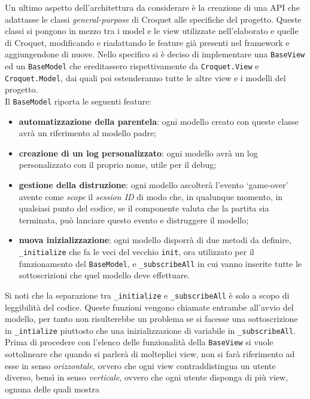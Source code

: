 \newline
Un ultimo aspetto dell'architettura da considerare è la creazione di una API che adattasse le classi \textit{general-purpose} di Croquet alle specifiche del progetto. Queste classi si pongono
in mezzo tra i model e le view utilizzate nell'elaborato e quelle di Croquet, modificando e riadattando le feature già presenti nel framework e aggiungendone di nuove. Nello specifico
si è deciso di implementare una \texttt{BaseView} ed un \texttt{BaseModel} che ereditassero rispettivamente da \texttt{Croquet.View} e \texttt{Croquet.Model}, dai quali poi estenderanno
tutte le altre view e i modelli del progetto.\\
Il \texttt{BaseModel} riporta le seguenti feature:
\begin{itemize}
    \item \textbf{automatizzazione della parentela}: ogni modello creato con queste classe avrà un riferimento al modello padre;
    \item \textbf{creazione di un log personalizzato}: ogni modello avrà un log personalizzato con il proprio nome, utile per il debug;
    \item \textbf{gestione della distruzione}: ogni modello ascolterà l'evento `game-over' avente come \textit{scope} il \textit{session ID} di modo che, in qualunque momento, in qualsiasi
    punto del codice, se il componente valuta che la partita sia terminata, può lanciare questo evento e distruggere il modello;
    \item \textbf{nuova inizializzazione}: ogni modello disporrà di due metodi da definire, \texttt{\_initialize} che fa le veci del vecchio \texttt{init}, ora utilizzato per il funzionamento
    del \texttt{BaseModel}, e \texttt{\_subscribeAll} in cui vanno inserite tutte le sottoscrizioni che quel modello deve effettuare.
\end{itemize}
Si noti che la separazione tra \texttt{\_initialize} e \texttt{\_subscribeAll} è solo a scopo di leggibilità del codice. Queste funzioni vengono chiamate entrambe all'avvio del modello, per
tanto non risulterebbe un problema se si facesse una sottoscrizione in \texttt{\_intialize} piuttosto che una inizializzazione di variabile in \texttt{\_subscribeAll}.\\
Prima di procedere con l'elenco delle funzionalità della \texttt{BaseView} si vuole sottolineare che quando si parlerà di molteplici view, non si farà riferimento ad esse in senso
\textit{orizzontale}, ovvero che ogni view contraddistingua un utente diverso, bensì in senso \textit{verticale}, ovvero che ogni utente disponga di più view, ognuna delle quali mostra
